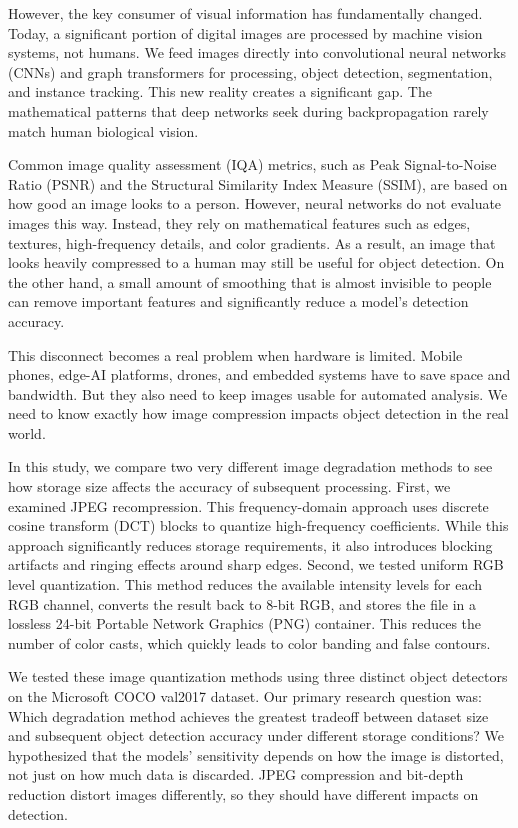 \documentclass[12pt, a4paper]{article}
\begin{document}
However, the key consumer of visual information has fundamentally changed. Today, a significant portion of digital images are processed by machine vision systems, not humans. We feed images directly into convolutional neural networks (CNNs) and graph transformers for processing, object detection, segmentation, and instance tracking. This new reality creates a significant gap. The mathematical patterns that deep networks seek during backpropagation rarely match human biological vision.

Common image quality assessment (IQA) metrics, such as Peak Signal-to-Noise Ratio (PSNR) and the Structural Similarity Index Measure (SSIM), are based on how good an image looks to a person. However, neural networks do not evaluate images this way. Instead, they rely on mathematical features such as edges, textures, high-frequency details, and color gradients. As a result, an image that looks heavily compressed to a human may still be useful for object detection. On the other hand, a small amount of smoothing that is almost invisible to people can remove important features and significantly reduce a model's detection accuracy.

This disconnect becomes a real problem when hardware is limited. Mobile phones, edge-AI platforms, drones, and embedded systems have to save space and bandwidth. But they also need to keep images usable for automated analysis. We need to know exactly how image compression impacts object detection in the real world. 

In this study, we compare two very different image degradation methods to see how storage size affects the accuracy of subsequent processing. First, we examined JPEG recompression. This frequency-domain approach uses discrete cosine transform (DCT) blocks to quantize high-frequency coefficients. While this approach significantly reduces storage requirements, it also introduces blocking artifacts and ringing effects around sharp edges. Second, we tested uniform RGB level quantization. This method reduces the available intensity levels for each RGB channel, converts the result back to 8-bit RGB, and stores the file in a lossless 24-bit Portable Network Graphics (PNG) container. This reduces the number of color casts, which quickly leads to color banding and false contours.

We tested these image quantization methods using three distinct object detectors on the Microsoft COCO val2017 dataset. Our primary research question was: Which degradation method achieves the greatest tradeoff between dataset size and subsequent object detection accuracy under different storage conditions? We hypothesized that the models' sensitivity depends on how the image is distorted, not just on how much data is discarded. JPEG compression and bit-depth reduction distort images differently, so they should have different impacts on detection.
\end{document}
